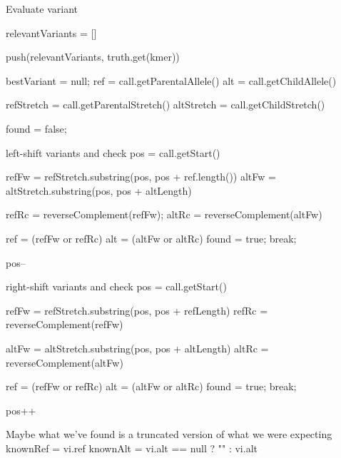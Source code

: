 \begin{algorithm}
\caption{Evaluate variant}
\label{alg:evalVariant}
\begin{algorithmic}[1]
    \State relevantVariants = []

            \State push(relevantVariants, truth.get(kmer))
        \EndIf
    \EndFor

    \State bestVariant = null;
        \State ref = call.getParentalAllele()
        \State alt = call.getChildAllele()

        \State refStretch = call.getParentalStretch()
        \State altStretch = call.getChildStretch()

        \State found = false;

            \Comment left-shift variants and check
            \State pos = call.getStart()

                \State refFw = refStretch.substring(pos, pos + ref.length())
                \State altFw = altStretch.substring(pos, pos + altLength)

                \State refRc = reverseComplement(refFw);
                \State altRc = reverseComplement(altFw)

                    \State ref = (refFw or refRc)
                    \State alt = (altFw or altRc)
                    \State found = true;
                    \State break;
                \EndIf

                \State pos--
            \EndWhile
        \EndIf

            \Comment right-shift variants and check
            \State pos = call.getStart()

                \State refFw = refStretch.substring(pos, pos + refLength)
                \State refRc = reverseComplement(refFw)

                \State altFw = altStretch.substring(pos, pos + altLength)
                \State altRc = reverseComplement(altFw)

                    \State ref = (refFw or refRc)
                    \State alt = (altFw or altRc)
                    \State found = true;
                    \State break;
                \EndIf

                \State pos++
            \EndWhile
        \EndIf

        \Comment Maybe what we've found is a truncated version of what we were expecting
        \State knownRef = vi.ref
        \State knownAlt = vi.alt == null ? "" : vi.alt

\end{algorithmic}
\end{algorithm}

